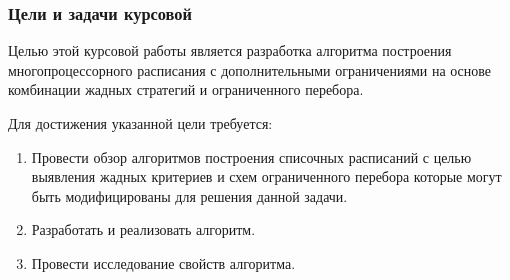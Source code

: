 \begin{frame}
    \frametitle{Цели и задачи курсовой}
    Целью этой курсовой работы является разработка алгоритма построения многопроцессорного расписания с дополнительными ограничениями на основе комбинации жадных стратегий и ограниченного перебора. 

    Для достижения указанной цели требуется:
    \begin{enumerate}
        \item Провести обзор алгоритмов построения списочных расписаний с целью выявления жадных критериев и схем ограниченного перебора которые могут быть модифицированы для решения данной задачи.
        \item Разработать и реализовать алгоритм.
        \item Провести исследование свойств алгоритма.
    \end{enumerate}
\end{frame}